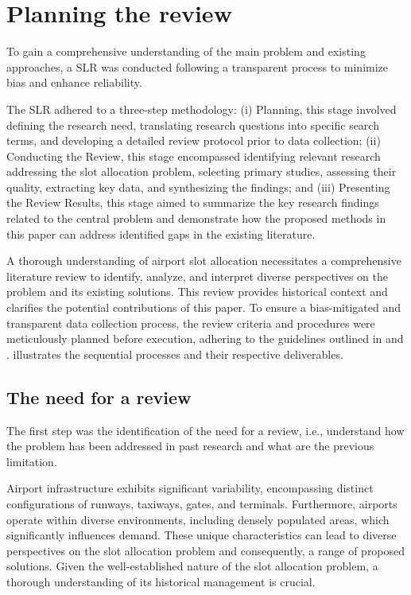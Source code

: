\section{Planning the review}
\label{section:Planning}

To gain a comprehensive understanding of the main problem and existing approaches, a \acrfull{SLR} was conducted following a transparent process to minimize bias and enhance reliability.

The \acrshort{SLR} adhered to a three-step methodology: (i) Planning, this stage involved defining the research need, translating research questions into specific search terms, and developing a detailed review protocol prior to data collection; (ii) Conducting the Review, this stage encompassed identifying relevant research addressing the slot allocation problem, selecting primary studies, assessing their quality, extracting key data, and synthesizing the findings; and (iii) Presenting the Review Results, this stage aimed to summarize the key research findings related to the central problem and demonstrate how the proposed methods in this paper can address identified gaps in the existing literature.

A thorough understanding of airport slot allocation necessitates a comprehensive literature review to identify, analyze, and interpret diverse perspectives on the problem and its existing solutions. This review provides historical context and clarifies the potential contributions of this paper. To ensure a bias-mitigated and transparent data collection process, the review criteria and procedures were meticulously planned before execution, adhering to the guidelines outlined in  and .  illustrates the sequential processes and their respective deliverables.

%

\subsection{The need for a review}

The first step was the identification of the need for a review, i.e., understand how the problem has been addressed in past research and what are the previous limitation. 

Airport infrastructure exhibits significant variability, encompassing distinct configurations of runways, taxiways, gates, and terminals. Furthermore, airports operate within diverse environments, including densely populated areas, which significantly influences demand. These unique characteristics can lead to diverse perspectives on the slot allocation problem and consequently, a range of proposed solutions. Given the well-established nature of the slot allocation problem, a thorough understanding of its historical management is crucial.


